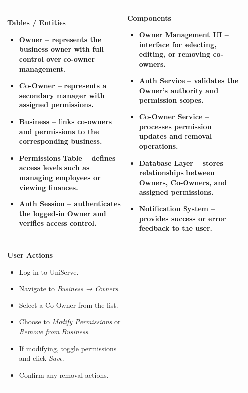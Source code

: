 \documentclass[]{VUMIFTemplateClass}
\newenvironment{mpitemlist}[1][\linewidth]{%
    \begin{minipage}[t]{#1}%
        \setlength{\leftmargini}{12pt}%
        \begin{itemize}%
            \setlength{\itemsep}{1pt}%
            \setlength{\parskip}{0pt}%
            \setlength{\parsep}{0pt}%
}{%
        \end{itemize}%
    \end{minipage}\newline
}
\begin{document}
\begin{center}
\setlength{\tabcolsep}{8pt}
\renewcommand{\arraystretch}{1.3}
\begin{tabular}{|p{0.48\linewidth}|p{0.48\linewidth}|}
\hline
\textbf{Tables / Entities} \newline
\begin{mpitemlist}
\item \textbf{Owner} – represents the business owner with full control over co-owner management.
\item \textbf{Co-Owner} – represents a secondary manager with assigned permissions.
\item \textbf{Business} – links co-owners and permissions to the corresponding business.
\item \textbf{Permissions Table} – defines access levels such as managing employees or viewing finances.
\item \textbf{Auth Session} – authenticates the logged-in Owner and verifies access control.
\end{mpitemlist}
&
\textbf{Components} \newline
\begin{mpitemlist}
\item \textbf{Owner Management UI} – interface for selecting, editing, or removing co-owners.
\item \textbf{Auth Service} – validates the Owner’s authority and permission scopes.
\item \textbf{Co-Owner Service} – processes permission updates and removal operations.
\item \textbf{Database Layer} – stores relationships between Owners, Co-Owners, and assigned permissions.
\item \textbf{Notification System} – provides success or error feedback to the user.
\end{mpitemlist}
\\ \hline
\textbf{User Actions} \newline
\begin{mpitemlist}
\item Log in to UniServe.
\item Navigate to \textit{Business → Owners}.
\item Select a Co-Owner from the list.
\item Choose to \textit{Modify Permissions} or \textit{Remove from Business}.
\item If modifying, toggle permissions and click \textit{Save}.
\item Confirm any removal actions.

\end{mpitemlist}
\end{tabular}
\end{center}
\end{document}
